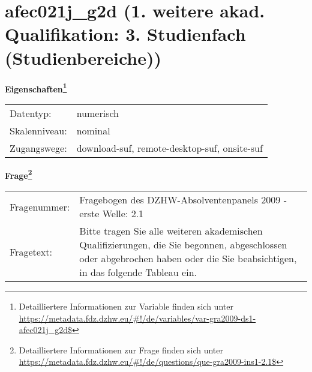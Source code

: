 
    \setcounter{footnote}{0}

    \vspace*{-1.8cm}
	\section{afec021j\_g2d (1. weitere akad. Qualifikation: 3. Studienfach (Studienbereiche))}
	\label{section:afec021j_g2d}



    \vspace*{0.5cm}
    \noindent\textbf{Eigenschaften\footnote{Detailliertere Informationen zur Variable finden sich unter
		\url{https://metadata.fdz.dzhw.eu/\#!/de/variables/var-gra2009-ds1-afec021j_g2d$}}}\\
	\begin{tabularx}{\hsize}{@{}lX}
	Datentyp: & numerisch \\
	Skalenniveau: & nominal \\
	Zugangswege: &
	  download-suf, 
	  remote-desktop-suf, 
	  onsite-suf
 \\
    \end{tabularx}



				\vspace*{0.5cm}
                \noindent\textbf{Frage\footnote{Detailliertere Informationen zur Frage finden sich unter
		              \url{https://metadata.fdz.dzhw.eu/\#!/de/questions/que-gra2009-ins1-2.1$}}}\\
				\begin{tabularx}{\hsize}{@{}lX}
					Fragenummer: &
					  Fragebogen des DZHW-Absolventenpanels 2009 - erste Welle:
					  2.1
 \\
					Fragetext: & Bitte tragen Sie alle weiteren akademischen Qualifizierungen, die Sie begonnen, abgeschlossen oder abgebrochen haben oder die Sie beabsichtigen, in das folgende Tableau ein. \\
				\end{tabularx}





